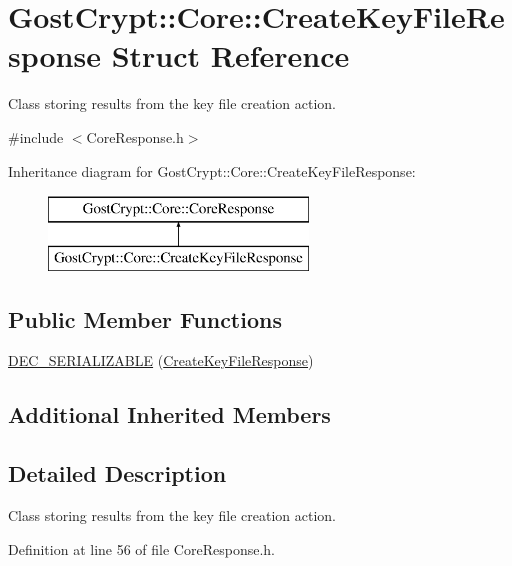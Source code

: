 \hypertarget{struct_gost_crypt_1_1_core_1_1_create_key_file_response}{}\section{Gost\+Crypt\+:\+:Core\+:\+:Create\+Key\+File\+Response Struct Reference}
\label{struct_gost_crypt_1_1_core_1_1_create_key_file_response}


Class storing results from the key file creation action.  




{\ttfamily \#include $<$Core\+Response.\+h$>$}

Inheritance diagram for Gost\+Crypt\+:\+:Core\+:\+:Create\+Key\+File\+Response\+:\begin{figure}[H]
\begin{center}
\leavevmode
\includegraphics[height=2.000000cm]{struct_gost_crypt_1_1_core_1_1_create_key_file_response}
\end{center}
\end{figure}
\subsection*{Public Member Functions}
\begin{DoxyCompactItemize}
\item 
\hyperlink{struct_gost_crypt_1_1_core_1_1_create_key_file_response_ab0049940702adffe43c8a63be9622da6}{D\+E\+C\+\_\+\+S\+E\+R\+I\+A\+L\+I\+Z\+A\+B\+LE} (\hyperlink{struct_gost_crypt_1_1_core_1_1_create_key_file_response}{Create\+Key\+File\+Response})
\end{DoxyCompactItemize}
\subsection*{Additional Inherited Members}


\subsection{Detailed Description}
Class storing results from the key file creation action. 

Definition at line 56 of file Core\+Response.\+h.



